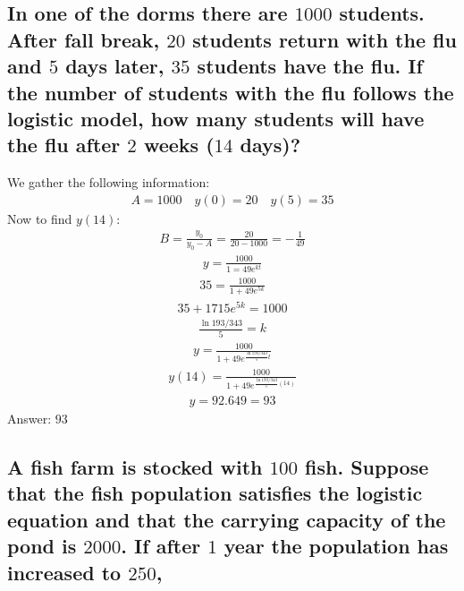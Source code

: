 \documentclass{article}
\begin{document}
\subsection{In one of the dorms there are $1000$ students. After fall break, $20$ students return with the flu and $5$ days later, $35$ students have the flu. If the number of students with the flu follows the logistic model, how many students will have the flu after $2$ weeks ($14$ days)?}
We gather the following information:
\begin{align*}
	A = 1000 \quad y(0) = 20 \quad y(5) = 35
\end{align*}
Now to find $y(14)$:
\begin{align*}
	B = \frac{y_0}{y_0 - A} = \frac{20}{20 - 1000} = -\frac{1}{49}
\end{align*}
\begin{align*}
	y = \frac{1000}{1 = 49e^{kt}}
\end{align*}
\begin{align*}
	35 = \frac{1000}{1 + 49e^{5k}}
\end{align*}
\begin{align*}
	35 + 1715e^{5k} = 1000
\end{align*}
\begin{align*}
	\frac{\ln{193/343}}{5} = k
\end{align*}
\begin{align*}
	y = \frac{1000}{1 + 49e^{\frac{\ln{193/343}}{5}t}}
\end{align*}
\begin{align*}
	y(14) = \frac{1000}{1 + 49e^{\frac{\ln{193/343}}{5}(14)}}
\end{align*}
\begin{align*}
	y = 92.649 = 93
\end{align*}
Answer: $93$

\subsection{A fish farm is stocked with $100$ fish. Suppose that the fish population satisfies the logistic equation and that the carrying capacity of the pond is $2000$. If after $1$ year the population has increased to $250$,}
\end{document}
